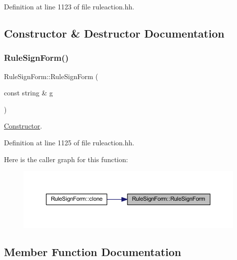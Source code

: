Definition at line 1123 of file ruleaction.\+hh.



\subsection{Constructor \& Destructor Documentation}
\mbox{\label{class_rule_sign_form_a4cdb9fa6bd841273118b599b46d1e982}} 
\subsubsection{\texorpdfstring{RuleSignForm()}{RuleSignForm()}}
{\footnotesize\ttfamily Rule\+Sign\+Form\+::\+Rule\+Sign\+Form (\begin{DoxyParamCaption}\item[{const string \&}]{g }\end{DoxyParamCaption})\hspace{0.3cm}{\ttfamily [inline]}}



\mbox{\hyperlink{class_constructor}{Constructor}}. 



Definition at line 1125 of file ruleaction.\+hh.

Here is the caller graph for this function\+:
\nopagebreak
\begin{figure}[H]
\begin{center}
\leavevmode
\includegraphics[width=350pt]{class_rule_sign_form_a4cdb9fa6bd841273118b599b46d1e982_icgraph}
\end{center}
\end{figure}


\subsection{Member Function Documentation}
\mbox{\label{class_rule_sign_form_a4d0250a44bacb1048487280de4ffcd3d}} 
